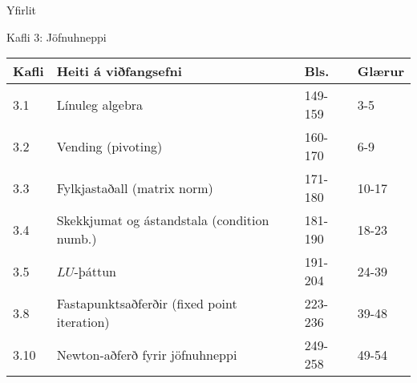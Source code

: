 \date{25.~og 27.~mars, og 8.~apríl 2015}



\begin{frame}
	\maketitle
\end{frame}

\begin{frame}{Yfirlit}
\begin{block}{Kafli 3: Jöfnuhneppi}
\begin{center}
\begin{tabular}{|l|l|l|l|}\hline
Kafli &Heiti á viðfangsefni &Bls. & Glærur\\
\hline
3.1 & Línuleg algebra & 149-159 & 3-5\\
3.2 & Vending (pivoting) & 160-170 & 6-9\\
3.3 & Fylkjastaðall (matrix norm) & 171-180 & 10-17\\
3.4 & Skekkjumat og ástandstala (condition numb.) & 181-190 & 18-23\\
3.5 & $LU$-þáttun & 191-204 & 24-39\\
3.8 & Fastapunktsaðferðir (fixed point iteration)& 223-236 & 39-48\\
3.10 & Newton-aðferð fyrir jöfnuhneppi &  249-258 & 49-54\\
\hline
\end{tabular}
\end{center}

\end{block}
\end{frame}

